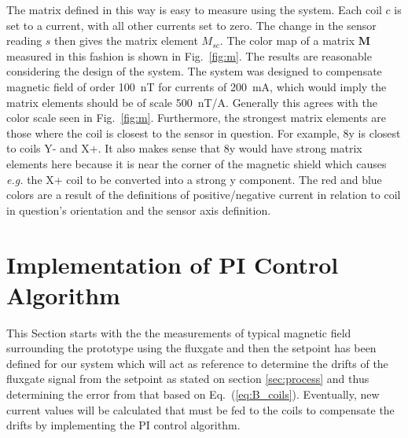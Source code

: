 The matrix defined in this way is easy to measure using the system.  Each coil $c$ is set to a current, with all other currents set to zero.  The change in the sensor reading $s$ then gives the matrix element $M_{sc}$. The color map of a matrix $\bm{M}$ measured in this fashion is shown in Fig.~\ref{fig:m}.  The results are reasonable considering the design of the system.  The system was designed to compensate magnetic field of order 100~nT for currents of 200~mA, which would imply the matrix elements should be of scale 500~nT/A.  Generally this agrees with the color scale seen in Fig.~\ref{fig:m}.  Furthermore, the strongest matrix elements are those where the coil is closest to the sensor in question.  For example, 8y is closest to coils Y- and X+.  It also makes sense that 8y would have strong matrix elements here because it is near the corner of the magnetic shield which causes {\it e.g.} the X+ coil to be converted into a strong y component.  The red and blue colors are a result of the definitions of positive/negative current in relation to coil in question's orientation and the sensor axis definition.


\FloatBarrier

\section{Implementation of PI Control Algorithm}\label{sec:pi}
 This Section starts with the the measurements of typical magnetic field surrounding the prototype using the fluxgate and then the setpoint has been defined for our system which will act as reference to determine the drifts of the fluxgate signal from the setpoint as stated on section \ref{sec:process} and thus determining the error from that based on Eq.~(\ref{eq:B_coils}). Eventually, new current values will be calculated that must be fed to the coils to compensate the drifts by implementing the PI control algorithm. 


